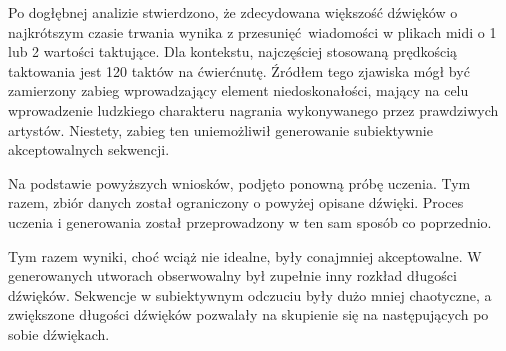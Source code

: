 {{        Po dogłębnej analizie stwierdzono, że zdecydowana większość dźwięków o najkrótszym czasie trwania
        wynika z przesunięć wiadomości w plikach midi o 1 lub 2 wartości taktujące. Dla kontekstu, najczęściej stosowaną
        prędkością taktowania jest 120 taktów na ćwierćnutę. Źródłem tego zjawiska mógł być zamierzony 
        zabieg wprowadzający element niedoskonałości, mający na celu wprowadzenie ludzkiego charakteru nagrania 
        wykonywanego przez prawdziwych artystów.
        Niestety, zabieg ten uniemożliwił generowanie subiektywnie akceptowalnych sekwencji.

        Na podstawie powyższych wniosków, podjęto ponowną próbę uczenia. Tym razem, zbiór danych został
        ograniczony o powyżej opisane dźwięki. Proces uczenia i generowania został przeprowadzony w ten sam sposób
        co poprzednio. 




        \bigskip

        Tym razem wyniki, choć wciąż nie idealne, były conajmniej akceptowalne. W generowanych utworach
        obserwowalny był zupełnie inny rozkład długości dźwięków. Sekwencje w subiektywnym odczuciu były dużo mniej
        chaotyczne, a zwiększone długości dźwięków pozwalały na skupienie się na następujących po sobie dźwiękach.
        
}}

